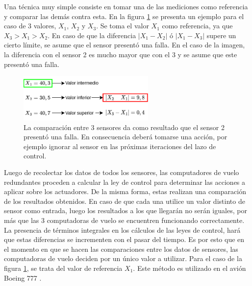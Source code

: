 
Una técnica muy simple consiste en tomar una de las mediciones como referencia y comparar las demás contra esta. En la figura \ref{fig:votacion_sensores} se presenta un ejemplo para el caso de 3 valores, $X_1$, $X_2$ y $X_3$. Se toma el valor $X_1$ como referencia, ya que $X_3 > X_1 > X_2$. En caso de que la diferencia $| X_1 - X_2 |$ ó $| X_1 - X_3 |$ supere un cierto límite, se asume que el sensor presentó una falla. En el caso de la imagen, la diferencia con el sensor 2 es mucho mayor que con el 3 y se asume que este presentó una falla.

\begin{figure}[htb]
    \centering
    \includegraphics[width=0.6\textwidth]{img/votacion_sensores.png}
    \caption{La comparación entre 3 sensores da como resultado que el sensor 2 presentó una falla. En consecuencia deberá tomarse una acción, por ejemplo ignorar al sensor en las próximas iteraciones del lazo de control.}
    \label{fig:votacion_sensores}
\end{figure}

Luego de recolectar los datos de todos los sensores, las computadores de vuelo redundantes proceden a calcular la ley de control para determinar las acciones a aplicar sobre los actuadores. De la misma forma, estas realizan una comparación de los resultados obtenidos. En caso de que cada una utilice un valor distinto de sensor como entrada, luego los resultados a los que llegarán no serán iguales, por más que las 3 computadoras de vuelo se encuentren funcionando correctamente. La presencia de términos integrales en los cálculos de las leyes de control, hará que estas diferencias se incrementen con el pasar del tiempo. Es por esto que en el momento en que se hacen las comparaciones entre los datos de sensores, las computadoras de vuelo deciden por un único valor a utilizar. Para el caso de la figura \ref{fig:votacion_sensores}, se trata del valor de referencia $X_1$. Este método es utilizado en el avión Boeing 777 \cite{yeh1996triple}. 

